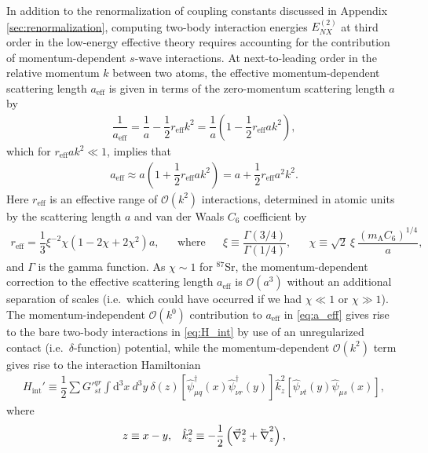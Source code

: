 \documentclass[preprint,showkeys,nofootinbib]{revtex4-1}
\renewcommand{\t}{\text} %
\newcommand{\f}{\dfrac} %
\newcommand{\p}[1]{\left(#1\right)} %
\renewcommand{\sp}[1]{\left[#1\right]} %
\renewcommand{\d}{\text{d}}
\renewcommand{\O}{\mathcal{O}}
\newcommand{\1}{\mathds{1}}
\newcommand{\mA}{m_{\text{A}}} %
\newcommand{\lvec}[1]
{\reflectbox{\ensuremath{\vec{\reflectbox{\ensuremath{#1}}}}}}
\begin{document}
In addition to the renormalization of coupling constants discussed in
Appendix \ref{sec:renormalization}, computing two-body interaction
energies $E_{NX}^{(2)}$ at third order in the low-energy effective
theory requires accounting for the contribution of momentum-dependent
$s$-wave interactions.  At next-to-leading order in the relative
momentum $k$ between two atoms, the effective momentum-dependent
scattering length $a_{\t{eff}}$ is given in terms of the zero-momentum
scattering length $a$ by \cite{giorgini2008theory, blume2002fermi,
  flambaum1999analytical}
\begin{align}
  \f1{a_{\t{eff}}}
  = \f1a - \f12 r_{\t{eff}} k^2
  = \f1a\p{1 - \f12 r_{\t{eff}} a k^2},
\end{align}
which for $r_{\t{eff}} a k^2 \ll 1$, implies that
\begin{align}
  a_{\t{eff}}
  \approx a\p{1 + \f12 r_{\t{eff}} a k^2}
  = a + \f12 r_{\t{eff}} a^2 k^2.
  \label{eq:a_eff}
\end{align}
Here $r_{\t{eff}}$ is an effective range of $\O\p{k^2}$ interactions,
determined in atomic units by the scattering length $a$ and van der
Waals $C_6$ coefficient by \cite{flambaum1999analytical}
\begin{align}
  r_{\t{eff}} = \f13 \xi^{-2} \chi \p{1 - 2\chi + 2\chi^2} a,
  &&
  \t{where}
  &&
  \xi \equiv \f{\Gamma\p{3/4}}{\Gamma\p{1/4}},
  &&
  \chi \equiv \sqrt{2}~ \xi~ \f{\p{\mA C_6}^{1/4}}{a},
  \label{eq:effective_range}
\end{align}
and $\Gamma$ is the gamma function.  As $\chi\sim1$ for ${}^{87}$Sr,
the momentum-dependent correction to the effective scattering length
$a_{\t{eff}}$ is $\O\p{a^3}$ without an additional separation of
scales (i.e.~which could have occurred if we had $\chi\ll1$ or
$\chi\gg1$).  The momentum-independent $\O\p{k^0}$ contribution to
$a_{\t{eff}}$ in \eqref{eq:a_eff} gives rise to the bare two-body
interactions in \eqref{eq:H_int} by use of an unregularized contact
(i.e.~$\delta$-function) potential, while the momentum-dependent
$\O\p{k^2}$ term gives rise to the interaction Hamiltonian
\cite{blume2002fermi, johnson2012effective}
\begin{align}
  H_{\t{int}}'
  \equiv \f12 \sum {G'}^{qr}_{st} \int \d^3 x~d^3y~\delta\p{z}
  \sp{\hat\psi_{\mu q}^\dag\p{x} \hat\psi_{\nu r}^\dag\p{y}}
  \hat k_z^2\sp{\hat\psi_{\nu t}\p{y} \hat\psi_{\mu s}\p{x}},
  \label{eq:H_int_primed}
\end{align}
where
\begin{align}
  z \equiv x - y,
  &&
  \hat k_z^2
  \equiv -\f12 \p{\vec\nabla_z^2 + \lvec\nabla_z^2},
\end{align}
\end{document}

